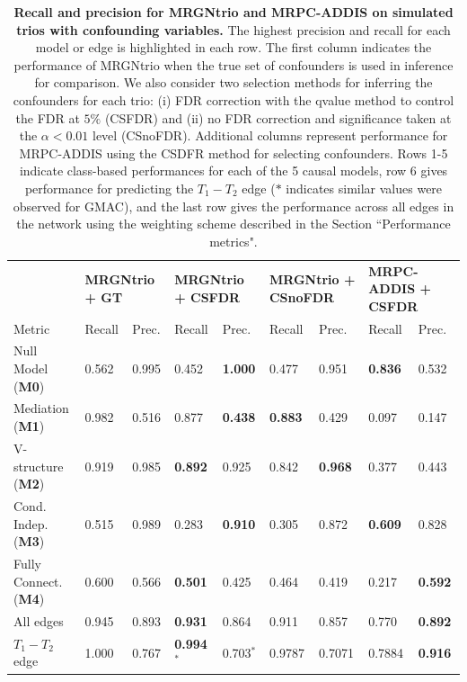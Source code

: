 \documentclass[12pt,letterpaper]{report}
\begin{document}
\begin{table}[H]
	\caption{\textbf{Recall and precision for MRGNtrio and MRPC-ADDIS on simulated trios with confounding variables.} The highest precision and recall for each model or edge is highlighted in each row. The first column indicates the performance of MRGNtrio when the true set of confounders is used in inference for comparison. We also consider two selection methods for inferring the confounders for each trio: (i) FDR correction with the qvalue method to control the FDR at $5\%$ (CSFDR) and (ii) no FDR correction and significance taken at the $\alpha < 0.01$ level (CSnoFDR). Additional columns represent performance for MRPC-ADDIS using the CSDFR method for selecting confounders. Rows 1-5 indicate class-based performances for each of the 5 causal models, row 6 gives performance for predicting the $T_1-T_2$ edge ($\ast$ indicates similar values were observed for GMAC), and the last row gives the performance across all edges in the network using the weighting scheme described in the Section ``Performance metrics".}
	\renewcommand{\arraystretch}{0.9} %
	\begin{tabular}{l|ll|ll|ll|ll}
		\toprule
		 & \multicolumn{2}{p{2.8cm}|}{\centering \bf MRGNtrio + GT} &  \multicolumn{2}{p{2.8cm}|}{\centering \bf MRGNtrio + CSFDR} & 
		\multicolumn{2}{p{2.8cm}|}{\centering \bf MRGNtrio + CSnoFDR} & 
		\multicolumn{2}{p{2.8cm}}{\centering \bf MRPC-ADDIS + CSFDR} \\

		Metric & Recall & Prec. & Recall & Prec. & Recall & Prec. & Recall & Prec. \\ 
		\midrule[0.04cm]
		Null Model ({\bf M0}) & 0.562  & 0.995  & 0.452  & \bf 1.000  & 0.477  & 0.951  & \bf 0.836  & 0.532  \\
		Mediation ({\bf M1}) & 0.982  & 0.516  & 0.877 & \bf 0.438  & \bf 0.883  & 0.429  & 0.097  & 0.147  \\
		V-structure ({\bf M2}) & 0.919  & 0.985  & \bf 0.892  & 0.925  & 0.842  & \bf 0.968  & 0.377  & 0.443  \\ 
		Cond. Indep. ({\bf M3}) & 0.515  & 0.989  & 0.283  & \bf 0.910  & 0.305  & 0.872  & \bf 0.609  & 0.828  \\ 
		Fully Connect. ({\bf M4}) & 0.600  & 0.566  & \bf 0.501  & 0.425  & 0.464  & 0.419  & 0.217  & \bf 0.592  \\ 
		All edges  & 0.945  & 0.893  & \bf 0.931  & 0.864  & 0.911  & 0.857  & 0.770  & \bf 0.892  \\
		$T_1-T_2$ edge & 1.000  & 0.767  & \bf 0.994$^*$  & 0.703$^*$  & 0.9787 & 0.7071 & 0.7884 & \bf 0.916 \\
		\bottomrule
	\end{tabular}
	\label{tab:results}
\end{table}
\end{document}

